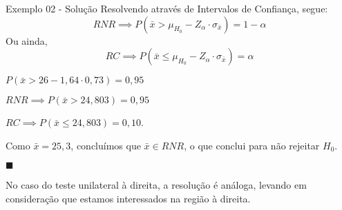 \documentclass[hyperref={pdfpagelabels=false}]{beamer}
\begin{document}
\begin{frame}{Exemplo 02 - Solução}
	Resolvendo através de Intervalos de Confiança, segue: \pause
	$$RNR \implies P(\bar{x} > \mu_{H_0} - Z_{\alpha} \cdot \sigma_{\bar{x}}) = 1 - \alpha$$ \pause
	Ou ainda, \pause
	$$RC \implies P(\bar{x} \leq \mu_{H_0} - Z_{\alpha} \cdot \sigma_{\bar{x}}) = \alpha$$ \pause
	
	$P(\bar{x} > 26 - 1,64 \cdot 0,73) = 0,95$ \pause
	
	$RNR \implies P(\bar{x} > 24,803) = 0,95$ \pause
	
	$RC \implies P(\bar{x} \leq 24,803) = 0,10$. \pause
	
	Como $\bar{x} = 25,3$, concluímos que $\bar{x} \in RNR$, o que conclui para não rejeitar $H_0$. 
	\begin{flushright}
		$\blacksquare$
	\end{flushright} \pause
	No caso do teste unilateral à direita, a resolução é análoga, levando em consideração que estamos interessados na região à direita.
\end{frame}
\end{document}
